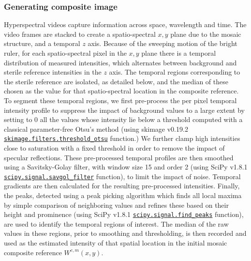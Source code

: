 \subsubsection{Generating composite image}
\label{algorithmcomposite}
Hyperspectral videos capture information across space, wavelength and time.
%
The video frames are stacked to create a spatio-spectral $x,y$ plane due to the mosaic structure, and a temporal $z$ axis.
%
%
%
%
Because of the sweeping motion of the bright ruler,
for each spatio-spectral pixel in the $x, y$ plane there is a temporal distribution of measured intensities, which alternates between background and sterile reference intensities in the $z$ axis.
The temporal regions corresponding to the sterile reference are isolated, as detailed below, and the median of these chosen as the value for that spatio-spectral location in the composite reference.
To segment these temporal regions,
%
%
%
we first pre-process the per pixel temporal intensity profile to suppress the impact of background values to a large extent by setting to 0 all the values whose intensity lie below a threshold computed with a classical parameter-free Otsu's method
\cite{Otsu1979} (using skimage v0.19.2 \href{https://scikit-image.org/docs/stable/api/skimage.filters.html\#skimage.filters.threshold_otsu}{\texttt{skimage.filters.threshold\_otsu}} function.)
We further clamp high intensities close to saturation with a fixed threshold in order to remove the impact of specular reflections.
%
These pre-processed temporal profiles are then smoothed using a Savitsky-Golay filter, with window size 15 and order 2
%
\cite{Savitzky1964a}
(using SciPy v1.8.1 \href{https://docs.scipy.org/doc/scipy/reference/generated/scipy.signal.savgol_filter.html}{\texttt{scipy.signal.savgol\_filter}} function),
%
to limit the impact of noise.
Temporal gradients are then calculated for the resulting pre-processed intensities.
Finally, the peaks, detected using a peak picking algorithm which finds all local maxima by simple comparison of neighboring values and refines these based on their height and prominence (using SciPy v1.8.1 \href{https://docs.scipy.org/doc/scipy/reference/generated/scipy.signal.find_peaks.html}{\texttt{scipy.signal.find\_peaks}} function),
%
are used to identify the temporal regions of interest.
The median of the raw values in these regions, prior to smoothing and thresholding, is then recorded and used as the estimated intensity of that spatial location in the initial mosaic composite reference $W^{c,m}(x, y)$.
% 
% 
% 
% 	
% 	
% 	
% 	
% 
% 

